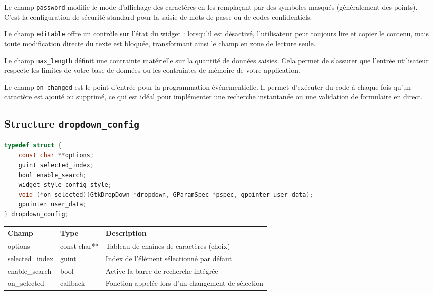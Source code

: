 Le champ \texttt{password} modifie le mode d'affichage des caractères en les remplaçant par des symboles masqués (généralement des points). C'est la configuration de sécurité standard pour la saisie de mots de passe ou de codes confidentiels.

Le champ \texttt{editable} offre un contrôle sur l'état du widget : lorsqu'il est désactivé, l'utilisateur peut toujours lire et copier le contenu, mais toute modification directe du texte est bloquée, transformant ainsi le champ en zone de lecture seule.

Le champ \texttt{max\_length} définit une contrainte matérielle sur la quantité de données saisies. Cela permet de s'assurer que l'entrée utilisateur respecte les limites de votre base de données ou les contraintes de mémoire de votre application.

Le champ \texttt{on\_changed} est le point d'entrée pour la programmation événementielle. Il permet d'exécuter du code à chaque fois qu'un caractère est ajouté ou supprimé, ce qui est idéal pour implémenter une recherche instantanée ou une validation de formulaire en direct.

\subsection{Structure \texttt{dropdown\_config}}
\begin{lstlisting}[language=C]
typedef struct {
    const char **options;
    guint selected_index;
    bool enable_search;
    widget_style_config style;
    void (*on_selected)(GtkDropDown *dropdown, GParamSpec *pspec, gpointer user_data);
    gpointer user_data;
} dropdown_config;
\end{lstlisting}

\begin{center}
\begin{tabular}{|l|l|p{5cm}|}
\hline
\textbf{Champ} & \textbf{Type} & \textbf{Description} \\
\hline
options & const char** & Tableau de chaînes de caractères (choix) \\
\hline
selected\_index & guint & Index de l'élément sélectionné par défaut \\
\hline
enable\_search & bool & Active la barre de recherche intégrée \\
\hline
on\_selected & callback & Fonction appelée lors d'un changement de sélection \\
\hline
\end{tabular}
\end{center}

